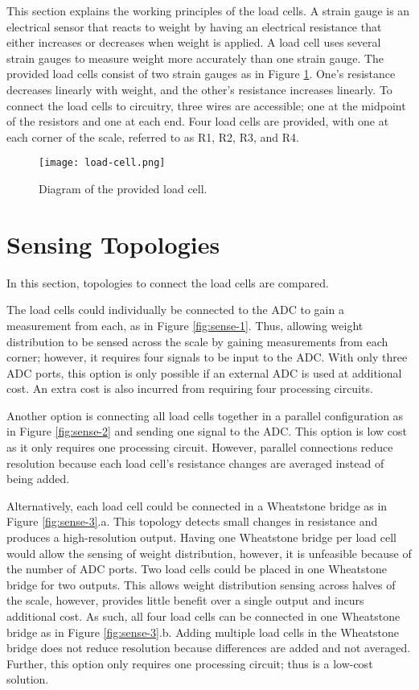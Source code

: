 This section explains the working principles of the load cells. A strain gauge is an electrical sensor that reacts to weight by having an electrical resistance that either increases or decreases when weight is applied. A load cell uses several strain gauges to measure weight more accurately than one strain gauge. The provided load cells consist of two strain gauges as in Figure \ref{fig:load_cell}. One’s resistance decreases linearly with weight, and the other’s resistance increases linearly. To connect the load cells to circuitry, three wires are accessible; one at the midpoint of the resistors and one at each end. Four load cells are provided, with one at each corner of the scale, referred to as R1, R2, R3, and R4.

\begin{figure}[!ht]
	\centering
	\texttt{[image: load-cell.png]}
	\caption{Diagram of the provided load cell.}
	\label{fig:load_cell}
\end{figure}


\section{Sensing Topologies}
In this section, topologies to connect the load cells are compared.

The load cells could individually be connected to the ADC to gain a measurement from each, as in Figure \ref{fig:sense-1}. Thus, allowing weight distribution to be sensed across the scale by gaining measurements from each corner; however, it requires four signals to be input to the ADC. With only three ADC ports, this option is only possible if an external ADC is used at additional cost. An extra cost is also incurred from requiring four processing circuits.

Another option is connecting all load cells together in a parallel configuration as in Figure \ref{fig:sense-2} and sending one signal to the ADC. This option is low cost as it only requires one processing circuit. However, parallel connections reduce resolution because each load cell's resistance changes are averaged instead of being added.

Alternatively, each load cell could be connected in a Wheatstone bridge as in Figure \ref{fig:sense-3}.a. This topology detects small changes in resistance and produces a high-resolution output. Having one Wheatstone bridge per load cell would allow the sensing of weight distribution, however, it is unfeasible because of the number of ADC ports. Two load cells could be placed in one Wheatstone bridge for two outputs. This allows weight distribution sensing across halves of the scale, however, provides little benefit over a single output and incurs additional cost. As such, all four load cells can be connected in one Wheatstone bridge as in Figure \ref{fig:sense-3}.b. Adding multiple load cells in the Wheatstone bridge does not reduce resolution because differences are added and not averaged. Further, this option only requires one processing circuit; thus is a low-cost solution. 


